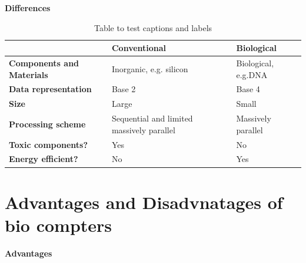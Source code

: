 \documentclass[a4paper]{article}
\begin{document}
\hspace{-12pt}\textbf{Differences}
\\ 
\begin{table}[h!]
\begin{center}{
\begin{tabular}{| m{7em} | m{4cm} | m{4cm} | }
  \hline
  \textbf{} & \textbf{Conventional} & \textbf{Biological}\\
  \hline
  \textbf{Components and Materials} & Inorganic, e.g. silicon & Biological, e.g.DNA\\ 
  \hline
  \textbf{Data representation} & Base 2  & Base 4\\
  \hline
  \textbf{Size} & Large & Small\\
  \hline
  \textbf{Processing scheme} & Sequential and limited massively parallel & Massively parallel\\
  \hline
  \textbf{Toxic components?} & Yes & No\\
  \hline
  \textbf{Energy efficient?} & No & Yes\\
  \hline
\end{tabular}
}
\caption{Table to test captions and labels}
\label{table:1}
\end{center}
\end{table}

\section{Advantages and Disadvnatages of bio compters}

\textbf{Advantages}
\end{document}
